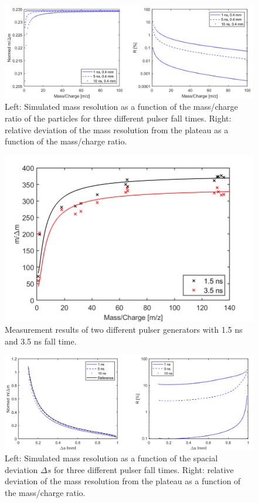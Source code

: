 	\begin{figure}[h] %
		\centering
		\includegraphics[width=\textwidth]{Bilder/PulseSimMassRes.png}
		\caption{Left: Simulated mass resolution as a function of the mass/charge ratio of the particles for three different pulser fall times. Right: relative deviation of the mass resolution from the plateau as a function of the mass/charge ratio.}
		\label{fig:Simtfall}
	\end{figure}
	\begin{figure}[h!] %
		\centering
		\includegraphics[width=.8\textwidth]{Bilder/PulseLabWLEm480.png}
		\caption{Measurement results of two different pulser generators with 1.5 ns and 3.5 ns fall time.}
		\label{fig:LabWLE}
	\end{figure}
	\begin{figure}[h!] %
		\centering
		\includegraphics[width=\textwidth]{Bilder/PulseSimPosition.png}
		\caption{Left: Simulated mass resolution as a function of the spacial deviation $\Delta s$ for three different pulser fall times. Right: relative deviation of the mass resolution from the plateau as a function of the mass/charge ratio.}
		\label{fig:SimtfallPos}
	\end{figure}
